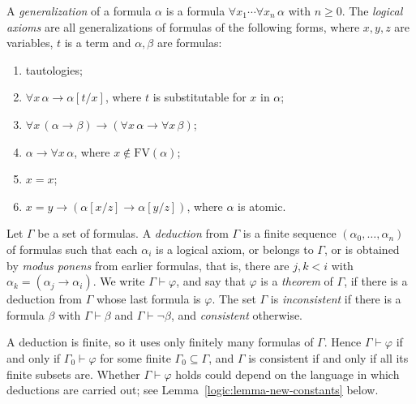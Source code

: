 \begin{definition}\label{logic:definition-logical-axioms}
A \emph{generalization} of a formula $\alpha$ is a formula
$\forall x_1 \cdots \forall x_n\, \alpha$ with $n \geq 0$. The \emph{logical
axioms} are all generalizations of formulas of the following forms, where
$x, y, z$ are variables, $t$ is a term and $\alpha, \beta$ are formulas:
\begin{enumerate}
\item[(A1)] tautologies;
\item[(A2)] $\forall x\,\alpha \to \alpha[t/x]$, where $t$ is substitutable for
$x$ in $\alpha$;
\item[(A3)] $\forall x\,(\alpha \to \beta) \to (\forall x\,\alpha \to \forall x\,\beta)$;
\item[(A4)] $\alpha \to \forall x\,\alpha$, where $x \notin \mathrm{FV}(\alpha)$;
\item[(A5)] $x = x$;
\item[(A6)] $x = y \to (\alpha[x/z] \to \alpha[y/z])$, where $\alpha$ is atomic.
\end{enumerate}
\end{definition}

\begin{definition}\label{logic:definition-deduction}
Let $\Gamma$ be a set of formulas. A \emph{deduction} from $\Gamma$ is a finite
sequence $(\alpha_0, \ldots, \alpha_n)$ of formulas such that each $\alpha_i$
is a logical axiom, or belongs to $\Gamma$, or is obtained by \emph{modus
ponens} from earlier formulas, that is, there are $j, k < i$ with
$\alpha_k = (\alpha_j \to \alpha_i)$. We write $\Gamma \vdash \varphi$, and say
that $\varphi$ is a \emph{theorem} of $\Gamma$, if there is a deduction from
$\Gamma$ whose last formula is $\varphi$. The set $\Gamma$ is
\emph{inconsistent} if there is a formula $\beta$ with $\Gamma \vdash \beta$ and
$\Gamma \vdash \neg\beta$, and \emph{consistent} otherwise.
\end{definition}

\begin{remark}\label{logic:remark-deductions-finite}
A deduction is finite, so it uses only finitely many formulas of $\Gamma$.
Hence $\Gamma \vdash \varphi$ if and only if $\Gamma_0 \vdash \varphi$ for some
finite $\Gamma_0 \subseteq \Gamma$, and $\Gamma$ is consistent if and only if
all its finite subsets are. Whether $\Gamma \vdash \varphi$ holds could depend
on the language in which deductions are carried out; see
Lemma~\ref{logic:lemma-new-constants} below.
\end{remark}

